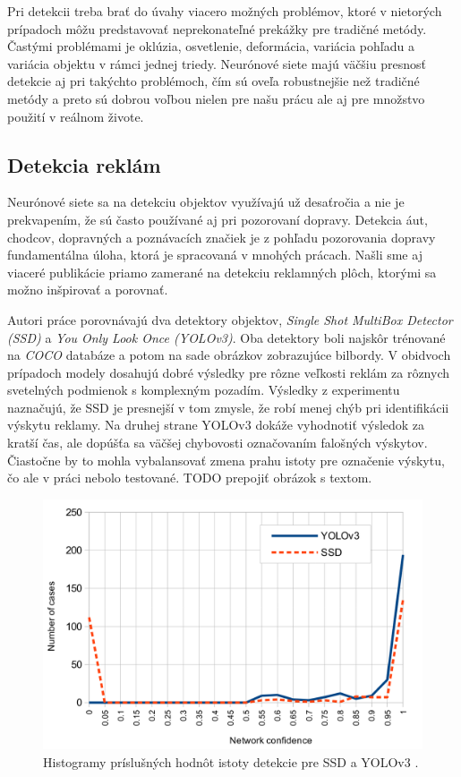 Pri detekcii treba brať do úvahy viacero možných problémov, ktoré v nietorých prípadoch môžu predstavovať neprekonateľné prekážky pre tradičné metódy. Častými problémami je oklúzia, osvetlenie, deformácia, variácia pohľadu a variácia objektu v rámci jednej triedy. Neurónové siete majú väčšiu presnosť detekcie aj pri takýchto problémoch, čím sú oveľa robustnejšie než tradičné metódy a preto sú dobrou voľbou nielen pre našu prácu  ale aj pre množstvo použití v reálnom živote. 

\subsection{Detekcia reklám}

Neurónové siete sa na detekciu objektov využívajú už desaťročia a nie je prekvapením, že sú často používané aj pri pozorovaní dopravy. Detekcia áut, chodcov, dopravných a poznávacích značiek je z pohľadu pozorovania dopravy fundamentálna úloha, ktorá je spracovaná v mnohých prácach. Našli sme aj viaceré publikácie priamo zamerané na detekciu reklamných plôch, ktorými sa možno inšpirovať a porovnať.

Autori práce \cite{SSD-YOLO} porovnávajú dva detektory objektov, \textit{Single Shot MultiBox Detector (SSD)} a \textit{You Only Look Once (YOLOv3)}. Oba detektory boli najskôr trénované na \textit{COCO} databáze \cite{Coco} a potom na sade obrázkov zobrazujúce bilbordy. V obidvoch prípadoch modely dosahujú dobré výsledky pre rôzne veľkosti reklám za rôznych svetelných podmienok s komplexným pozadím. Výsledky z experimentu naznačujú, že SSD je presnejší v tom zmysle, že robí menej chýb pri identifikácii výskytu reklamy. Na druhej strane YOLOv3 dokáže vyhodnotiť výsledok za kratší čas, ale dopúšťa sa väčšej chybovosti označovaním falošných výskytov. Čiastočne by to mohla vybalansovať zmena prahu istoty pre označenie výskytu, čo ale v práci nebolo testované. TODO prepojiť obrázok s textom.

\begin{figure}[H]
    \centering
    \includegraphics[width=.6\textwidth]{images/01/ssd-yolo.png}
    \caption{Histogramy príslušných hodnôt istoty detekcie pre SSD a YOLOv3 \cite{SSD-YOLO}.}
    \label{img:ssd-yolo}
\end{figure}


